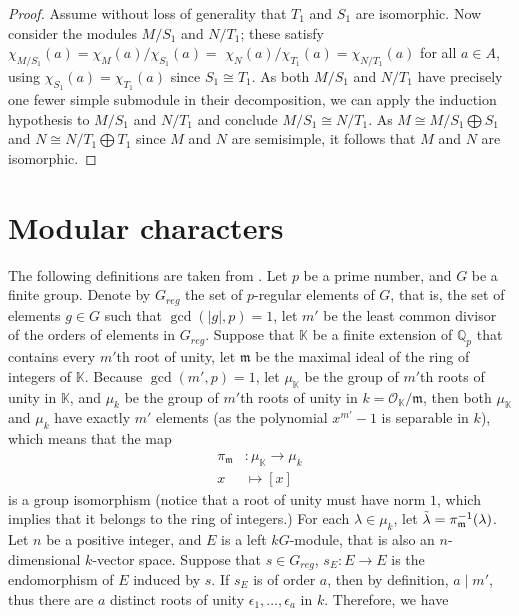 \documentclass[12pt,a4paper]{report}
\theoremstyle{definition}
\theoremstyle{remark}
\theoremstyle{definition}
\begin{document}
\begin{proof}
Assume without loss of generality that $T_{1}$ and $S_{1}$ are isomorphic. Now consider the modules $M / S_{1}$ and $N / T_{1}$; these satisfy $\chi_{M / S_{1}}(a)=\chi_{M}(a) / \chi_{S_{1}}(a)=$ $\chi_{N}(a) / \chi_{T_{1}}(a)=\chi_{N / T_{1}}(a)$ for all $a \in A$, using $\chi_{S_{1}}(a)=\chi_{T_{1}}(a)$ since $S_{1} \cong T_{1}$. As both $M / S_{1}$ and $N / T_{1}$ have precisely one fewer simple submodule in their decomposition, we can apply the induction hypothesis to $M / S_{1}$ and $N / T_{1}$ and conclude $M / S_{1} \cong N / T_{1}$. As $M \cong M / S_{1} \bigoplus S_{1}$ and $N \cong N / T_{1} \bigoplus T_{1}$ since $M$ and $N$ are semisimple, it follows that $M$ and $N$ are isomorphic.
\end{proof}
\section{Modular characters}\label{sec:2}
The following definitions are taken from \cite[Chapter 18]{serre1977representations}. Let $p$ be a prime number, and $G$ be a finite group. Denote by $G_{reg}$ the set of $p$-regular elements of $G$, that is, the set of elements $g\in G$ such that $\gcd(|g|, p) = 1$, let $m'$ be the least common divisor of the orders of elements in $G_{reg}$. Suppose that $\mathbb{K}$ be a finite extension of $\mathbb{Q}_p$ that contains every $m'$th root of unity, let $\mathfrak{m}$ be the maximal ideal of the ring of integers of $\mathbb{K}$. Because $\gcd(m', p) = 1$, let $\mu_{\mathbb{K}}$ be the group of $m'$th roots of unity in $\mathbb{K}$, and $\mu_{k}$ be the group of $m'$th roots of unity in $k=\mathcal{O}_{\mathbb{K}}/\mathfrak{m}$, then both $\mu_{\mathbb{K}}$ and $\mu_k$ have exactly $m'$ elements (as the polynomial $x^{m'}-1$ is separable in $k$), which means that the map 
\begin{align*}
    \pi_{\mathfrak{m}}&:  \mu_{\mathbb{K}}\to \mu_k\\
    x &\mapsto [x] 
\end{align*}
is a group isomorphism (notice that a root of unity must have norm $1$, which implies that it belongs to the ring of integers.) For each $\lambda\in \mu_k$, let $\Tilde{\lambda} = \pi_{\mathfrak{m}}^{-1}(\lambda)$. \smallbreak
Let $n$ be a positive integer, and $E$ is a left $kG$-module, that is also an $n$-dimensional $k$-vector space. Suppose that $s\in G_{reg}$, $s_E: E\to E$ is the endomorphism of $E$ induced by $s$. If $s_E$ is of order $a$, then by definition, $a\mid m'$, thus there are $a$ distinct roots of unity $\epsilon_1, \ldots, \epsilon_a$ in $k$. Therefore, we have
\end{document}
